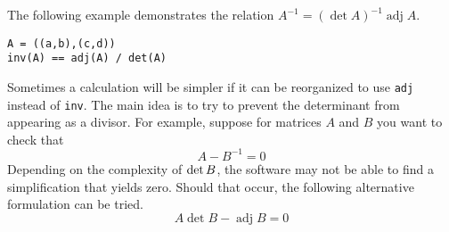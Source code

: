 \bigskip
\noindent
The following example demonstrates the relation
$A^{-1}=(\operatorname{det}A)^{-1}\operatorname{adj}A$.

{\color{blue}
\begin{verbatim}
A = ((a,b),(c,d))
inv(A) == adj(A) / det(A)
\end{verbatim}
}


\bigskip
\noindent
Sometimes a calculation will be simpler if it can be reorganized to use
\verb$adj$ instead of \verb$inv$.
The main idea is to try to prevent the determinant from appearing as a
divisor.
For example, suppose for matrices $A$ and $B$ you want to check that
\begin{equation*}
{A}-{B}^{-1}=0
\end{equation*}
Depending on the complexity of $\mathop{\rm det}B$, the software
may not be able to find a simplification that yields zero.
Should that occur, the following alternative formulation can be tried.
\begin{equation*}
A\operatorname{det}B-\operatorname{adj}B=0
\end{equation*}
